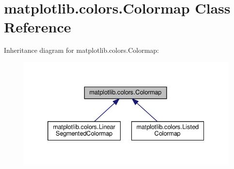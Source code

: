 \hypertarget{classmatplotlib_1_1colors_1_1Colormap}{}\section{matplotlib.\+colors.\+Colormap Class Reference}
\label{classmatplotlib_1_1colors_1_1Colormap}


Inheritance diagram for matplotlib.\+colors.\+Colormap\+:
\nopagebreak
\begin{figure}[H]
\begin{center}
\leavevmode
\includegraphics[width=332pt]{classmatplotlib_1_1colors_1_1Colormap__inherit__graph}
\end{center}
\end{figure}
